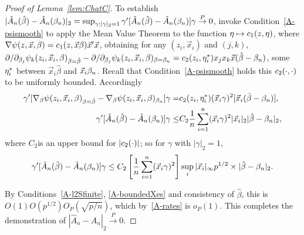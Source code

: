 \documentclass{article}
\theoremstyle{remark}
\begin{document}
\begin{proof}[Proof of Lemma~\ref{lem:ChatC}]
To establish $|\hat{A}_{n}(\hat\beta) - \hat{A}_{n}(\beta_{n })|_2 = \sup_{\gamma:
  |\gamma|_{2}=1}\gamma'[\hat{A}_{n}(\hat\beta) -
\hat{A}_{n}(\beta_{n }) ]\gamma  \stackrel{P}{\rightarrow} 0$,  invoke
Condition~\ref{A-psismooth} to apply the Mean Value Theorem to the
function $\eta \mapsto c_{1}(z, \eta)$, where $\nabla \psi(z, \vec{x},
\beta)  = c_{1}(z, \vec{x}\beta) \vec{x}'\vec{x}$, obtaining for any
$(z_{i}, \vec{x}_{i})$ and $(j,k)$,
$\partial/\partial_{\beta_{j}}\psi_{k}(z_{i},
\vec{x}_{i},\beta)_{\beta = \hat\beta}
- \partial/\partial_{\beta_{j}}\psi_{k}(z_{i}, \vec{x}_{i},
\beta)_{\beta = \beta_{n }}  =  c_{2}(z_{i},
\eta^{*}_{i})x_{j}x_{k}\vec{x}(\hat\beta - \beta_{n })$, some $\eta^{*}_{i}$
between $\vec{x}_{i}\hat\beta$ and $\vec{x}_{i}\beta_{n }$. Recall that
Condition~\ref{A-psismooth} holds this $c_{2}(\cdot, \cdot)$ to be
uniformly bounded. Accordingly 
\begin{align}
  \gamma'[\nabla_{\beta} \psi(z_{i}, \vec{x}_{i},\beta)_{\beta = \hat\beta} - \nabla_{\beta} \psi (z_{i}, \vec{x}_{i},\beta)_{\beta_{n }}]\gamma =& c_{2}(z_{i}, \eta^{*}_{i}) (\vec{x}_{i}\gamma)^{2} [\vec{x}_{i}(\hat\beta - \beta_{n })], \label{eq:21} \\
\gamma'[\hat{A}_{n}(\hat\beta) - \hat{A}_{n}(\beta_{n }) ]\gamma \leq & 
C_{2}\frac{1}{n} \sum_{i=1}^{n}(\vec{x}_{i}\gamma)^{2}
|\vec{x}_{i}|_{2} |\hat\beta - \beta_{n }|_{2}, \nonumber
\end{align}
where $C_{2}$is an upper bound for $|c_{2}(\cdot)|$; so for $\gamma$ with $|\gamma|_{2}=1$, 
\begin{equation*}
 \gamma'[\hat{A}_{n}(\hat\beta) - \hat{A}_{n}(\beta_{n }) ]\gamma \leq
 C_{2} \left[\frac{1}{n} 
\sum_{i=1}^{n}(\vec{x}_{i}\gamma)^{2}\right] \sup_{i}|\vec{x}_{i}|_{\infty} p^{1/2}
\times  |\hat\beta - \beta_{n } |_{2}.  
\end{equation*}

By Conditions~\ref{A-l2Sfinite}, \ref{A-boundedXes} %
and consistency of
$\hat\beta$, this is $O(1)O(p^{1/2}) O_{P}(\sqrt{p/n})$, which by~\ref{A-rates} is $o_{P}(1)$. 
This completes the demonstration of $|\hat{A}_{n} - A_{n}|_{2} \stackrel{P}{\rightarrow} 0$.


\end{proof}
\end{document}
